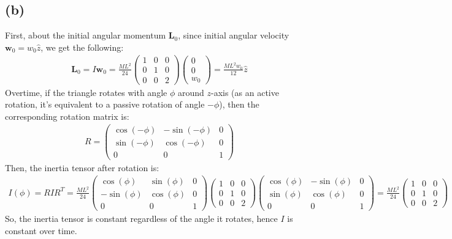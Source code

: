 \documentclass{article}
\begin{document}
\subsection*{(b)}
First, about the initial angular momentum $\textbf{L}_0$, since initial angular velocity $\textbf{w}_0 = w_0\hat{z}$, we get the following:
\begin{align}
    \textbf{L}_0 = I\textbf{w}_0 = \frac{ML^2}{24}\begin{pmatrix}
        1&0&0\\0&1&0\\0&0&2
    \end{pmatrix} \begin{pmatrix}
        0\\0\\w_0
    \end{pmatrix} = \frac{ML^2w_0}{12}\hat{z}
\end{align}
Overtime, if the triangle rotates with angle $\phi$ around $z$-axis (as an active rotation, it's equivalent to a passive rotation of angle $-\phi$), then the corresponding rotation matrix is:
\begin{align}
    R = \begin{pmatrix}
        \cos(-\phi) & -\sin(-\phi)&0\\
        \sin(-\phi) & \cos(-\phi)& 0\\
        0&0&1
    \end{pmatrix}
\end{align}
Then, the inertia tensor after rotation is:
\begin{align}
    I(\phi) = RIR^T = \frac{ML^2}{24}\begin{pmatrix}
        \cos(\phi) & \sin(\phi)&0\\
        -\sin(\phi) & \cos(\phi)& 0\\
        0&0&1
    \end{pmatrix}\begin{pmatrix}
        1&0&0\\0&1&0\\0&0&2
    \end{pmatrix}\begin{pmatrix}
        \cos(\phi) & -\sin(\phi)&0\\
        \sin(\phi) & \cos(\phi)& 0\\
        0&0&1
    \end{pmatrix}= \frac{ML^2}{24}\begin{pmatrix}
        1&0&0\\0&1&0\\0&0&2
    \end{pmatrix}
\end{align}
So, the inertia tensor is constant regardless of the angle it rotates, hence $I$ is constant over time.
\end{document}

